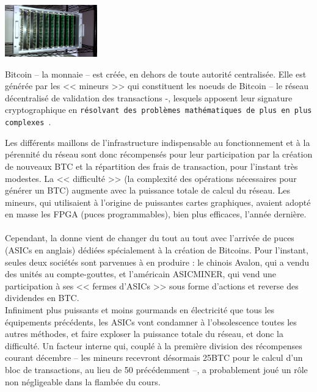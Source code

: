 \documentclass[11pt,twoside,a4paper]{article}
\begin{document}
\begin{minipage}[ht]{4.25cm}
	\includegraphics[width=4.00cm]{img/755273.jpg}~\\
\end{minipage} \hfill \begin{minipage}[ht]{15.00cm}
	Bitcoin -- la monnaie -- est cr{\'e}{\'e}e, en dehors de toute autorit{\'e} centralis{\'e}e. Elle est g{\'e}n{\'e}r{\'e}e par les << mineurs >> qui constituent les noeuds de Bitcoin -- le r{\'e}seau d{\'e}centralis{\'e} de validation des transactions -, lesquels apposent leur signature cryptographique en \texttt{r{\'e}solvant des probl{\`e}mes math{\'e}matiques de plus en plus complexes~\footnotemark}. ~\\
\end{minipage}

Les diff{\'e}rents maillons de l'infrastructure indispensable au fonctionnement et {\`a} la p{\'e}rennit{\'e} du r{\'e}seau sont donc r{\'e}compens{\'e}s pour leur participation par la cr{\'e}ation de nouveaux BTC et la r{\'e}partition des frais de transaction, pour l'instant tr{\`e}s modestes. La << difficult{\'e} >> (la complexit{\'e} des op{\'e}rations n{\'e}cessaires pour g{\'e}n{\'e}rer un BTC) augmente avec la puissance totale de calcul du r{\'e}seau. Les mineurs, qui utilisaient {\`a} l'origine de puissantes cartes graphiques, avaient adopt{\'e} en masse les FPGA (puces programmables), bien plus efficaces, l'ann{\'e}e derni{\`e}re. ~\\

Cependant, la donne vient de changer du tout au tout avec l'arriv{\'e}e de puces (ASICs en anglais) d{\'e}di{\'e}es sp{\'e}cialement {\`a} la cr{\'e}ation de Bitcoins. Pour l'instant, seules deux soci{\'e}t{\'e}s sont parvenues {\`a} en produire : le chinois Avalon, qui a vendu des unit{\'e}s au compte-gouttes, et l'am{\'e}ricain ASICMINER, qui vend une participation {\`a} ses << fermes d'ASICs >> sous forme d'actions et reverse des dividendes en BTC. ~\\

Infiniment plus puissants et moins gourmands en {\'e}lectricit{\'e} que tous les {\'e}quipements pr{\'e}c{\'e}dents, les ASICs vont condamner {\`a} l'obsolescence toutes les autres m{\'e}thodes, et faire exploser la puissance totale du r{\'e}seau, et donc la difficult{\'e}. Un facteur interne qui, coupl{\'e} {\`a} la premi{\`e}re division des r{\'e}compenses courant d{\'e}cembre -- les mineurs recevront d{\'e}sormais 25BTC pour le calcul d'un bloc de transactions, au lieu de 50 pr{\'e}c{\'e}demment –, a probablement jou{\'e} un r{\^o}le non n{\'e}gligeable dans la flamb{\'e}e du cours. ~\\
\end{document}
